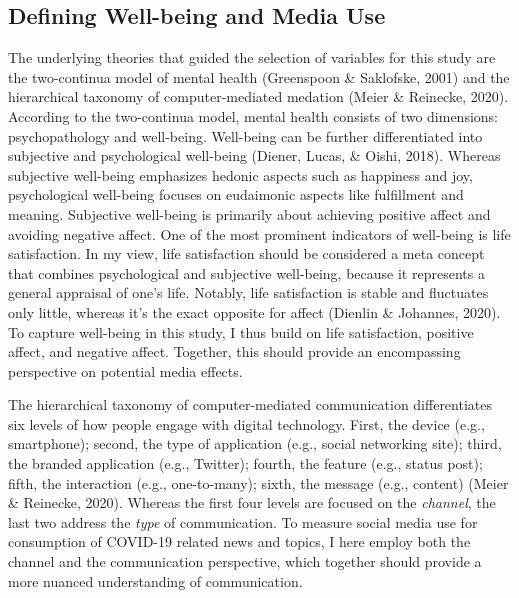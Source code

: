 \documentclass[
  english,
  man,mask,floatsintext]{apa6}
\begin{document}
\hypertarget{defining-well-being-and-media-use}{%
\subsection{Defining Well-being and Media Use}\label{defining-well-being-and-media-use}}

The underlying theories that guided the selection of variables for this study are the two-continua model of mental health (Greenspoon \& Saklofske, 2001) and the hierarchical taxonomy of computer-mediated medation (Meier \& Reinecke, 2020).
According to the two-continua model, mental health consists of two dimensions: psychopathology and well-being.
Well-being can be further differentiated into subjective and psychological well-being (Diener, Lucas, \& Oishi, 2018).
Whereas subjective well-being emphasizes hedonic aspects such as happiness and joy, psychological well-being focuses on eudaimonic aspects like fulfillment and meaning.
Subjective well-being is primarily about achieving positive affect and avoiding negative affect.
One of the most prominent indicators of well-being is life satisfaction.
In my view, life satisfaction should be considered a meta concept that combines psychological and subjective well-being, because it represents a general appraisal of one's life.
Notably, life satisfaction is stable and fluctuates only little, whereas it's the exact opposite for affect (Dienlin \& Johannes, 2020).
To capture well-being in this study, I thus build on life satisfaction, positive affect, and negative affect.
Together, this should provide an encompassing perspective on potential media effects.

The hierarchical taxonomy of computer-mediated communication differentiates six levels of how people engage with digital technology.
First, the device (e.g., smartphone); second, the type of application (e.g., social networking site); third, the branded application (e.g., Twitter); fourth, the feature (e.g., status post); fifth, the interaction (e.g., one-to-many); sixth, the message (e.g., content) (Meier \& Reinecke, 2020).
Whereas the first four levels are focused on the \emph{channel}, the last two address the \emph{type} of communication.
To measure social media use for consumption of COVID-19 related news and topics, I here employ both the channel and the communication perspective, which together should provide a more nuanced understanding of communication.
\end{document}
